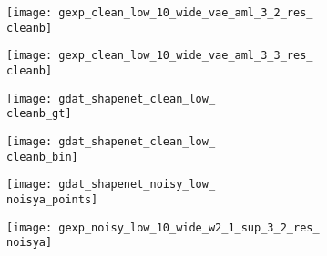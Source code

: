 \begin{figure*}[t]
{\begin{subfigure}[t]{1\textwidth}
\begin{subfigure}[t]{0.095\textwidth}
        	\texttt{[image: gexp\_clean\_low\_10\_wide\_vae\_aml\_3\_2\_res\_\\cleanb]}
        \end{subfigure}
        \begin{subfigure}[t]{0.095\textwidth}
        	\vspace{0px}\centering
        	\texttt{[image: gexp\_clean\_low\_10\_wide\_vae\_aml\_3\_3\_res\_\\cleanb]}
        \end{subfigure}
        \begin{subfigure}[t]{0.095\textwidth}
        	\vspace{0px}\centering
        	\texttt{[image: gdat\_shapenet\_clean\_low\_\\cleanb\_gt]}
        \end{subfigure}
        \begin{subfigure}[t]{0.095\textwidth}
        	\vspace{0px}\centering
        	\texttt{[image: gdat\_shapenet\_clean\_low\_\\cleanb\_bin]}
        \end{subfigure}
        \begin{subfigure}[t]{0.095\textwidth}
        	\vspace{0px}\centering
        	\texttt{[image: gdat\_shapenet\_noisy\_low\_\\noisya\_points]}
        \end{subfigure}
        \begin{subfigure}[t]{0.095\textwidth}
        	\vspace{0px}\centering
        	\texttt{[image: gexp\_noisy\_low\_10\_wide\_w2\_1\_sup\_3\_2\_res\_\\noisya]}
        \end{subfigure}
        \begin{subfigure}[t]{0.095\textwidth}
            \vspace{0px}\centering

\end{subfigure}
\end{subfigure}}
\end{figure*}
